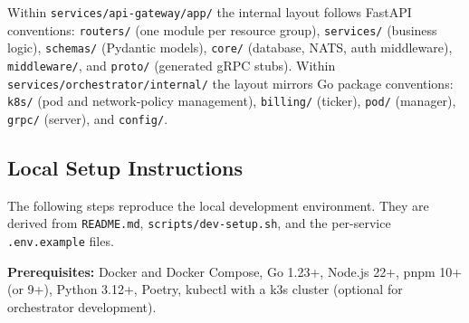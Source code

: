 \documentclass[12pt,a4paper]{article}
\begin{document}
\noindent
Within \texttt{services/api-gateway/app/} the internal layout follows
FastAPI conventions: \texttt{routers/} (one module per resource group),
\texttt{services/} (business logic), \texttt{schemas/} (Pydantic models),
\texttt{core/} (database, NATS, auth middleware), \texttt{middleware/},
and \texttt{proto/} (generated gRPC stubs).
Within \texttt{services/orchestrator/internal/} the layout mirrors Go
package conventions: \texttt{k8s/} (pod and network-policy management),
\texttt{billing/} (ticker), \texttt{pod/} (manager), \texttt{grpc/}
(server), and \texttt{config/}.

\subsection{Local Setup Instructions}

The following steps reproduce the local development environment.
They are derived from \texttt{README.md}, \texttt{scripts/dev-setup.sh},
and the per-service \texttt{.env.example} files.

\textbf{Prerequisites:} Docker and Docker Compose, Go 1.23+, Node.js 22+,
pnpm 10+ (or 9+), Python 3.12+, Poetry, kubectl with a k3s cluster
(optional for orchestrator development).
\end{document}
